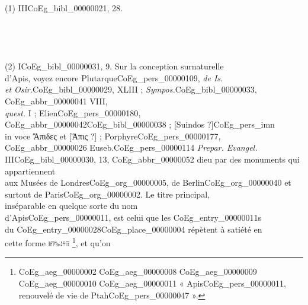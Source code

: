 \documentclass{book}
\begin{document}
{\begin{paracol}{2}
\noindent \\
\\
\\
\\
\\
\\
\\
\\
\\
\\
\\
\\
\\
\\
\\
\\
\\
\\
\\
(1) III\gls{CoEg_bibl_00000021}, 28.\\
\\
\\
\\
\\
(2) I\gls{CoEg_bibl_00000031}, 9. Sur la conception surnaturelle\\
d’Apis, voyez encore Plutarque\gls{CoEg_pers_00000109}, \textit{de Is.\\
et Osir.}\gls{CoEg_bibl_00000029}, XLIII ; \textit{Sympos.}\gls{CoEg_bibl_00000033}, \gls{CoEg_abbr_00000041} VIII,\\
\textit{quest.} I ; Elien\gls{CoEg_pers_00000180}, \gls{CoEg_abbr_00000042}\gls{CoEg_bibl_00000038} ; [Suindos ?]\gls{CoEg_pers_imn}\\
in voce Ἅπιδες et [Ἅπις ?] ; Porphyre\gls{CoEg_pers_00000177},\\
\gls{CoEg_abbr_00000026} Euseb.\gls{CoEg_pers_00000114} \textit{Prepar. Evangel.} III\gls{CoEg_bibl_00000030}, 13, \gls{CoEg_abbr_00000052}
\switchcolumn
\noindent dieu par des monuments qui appartiennent\\
aux Musées de Londres\gls{CoEg_org_00000005}, de Berlin\gls{CoEg_org_00000040} et\\
surtout de Paris\gls{CoEg_org_00000002}. Le titre principal,\\
inséparable en quelque sorte du nom\\
d’Apis\gls{CoEg_pers_00000011}, est celui que les \glspl{CoEg_entry_00000011}\\
du \Gls{CoEg_entry_00000028}\gls{CoEg_place_00000004} répètent à satiété en\\
cette forme \includegraphics[height=6pt]{CoEg_Mariette_hiero_1857-04-01_9_1.png} \footnote{\foreignlanguage{translit}{\Gls{CoEg_aeg_00000002} \gls{CoEg_aeg_00000008} \gls{CoEg_aeg_00000009} \gls{CoEg_aeg_00000010} \gls{CoEg_aeg_00000011}} « Apis\gls{CoEg_pers_00000011}, renouvelé de vie de Ptah\gls{CoEg_pers_00000047} ».}, et qu’on\\

\end{paracol}}
\end{document}
